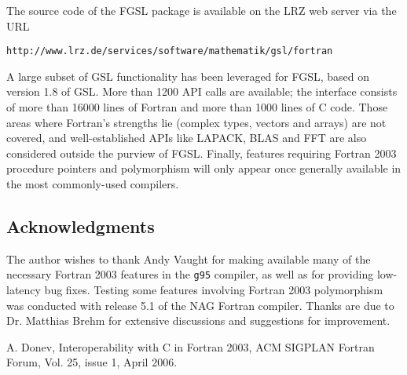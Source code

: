 \documentclass{article}
\begin{document}
The source code of the FGSL package is available on the LRZ web server
via the URL
\begin{center}
 \texttt{http://www.lrz.de/services/software/mathematik/gsl/fortran}
\end{center}
A large subset of GSL functionality has been leveraged for FGSL, based on 
version 1.8 of GSL. More than 1200 API calls are available; the interface
consists of more than 16000 lines of Fortran and more than 1000 lines of C code.
Those areas where Fortran's strengths lie (complex types, 
vectors and arrays) are not covered, and well-established APIs like
LAPACK, BLAS and FFT are also considered outside the purview of FGSL.
Finally, features
requiring Fortran 2003 procedure pointers and polymorphism will only appear once generally
available in the most commonly-used compilers.


{\small
\subsection{Acknowledgments}
\noindent
The author wishes to thank Andy Vaught for making available many of the 
necessary Fortran 2003 features in the \texttt{g95} compiler, as well as
for providing low-latency bug fixes. Testing some features involving 
Fortran 2003 polymorphism was conducted with release 5.1 of the
NAG Fortran compiler. Thanks are due to Dr. Matthias Brehm for extensive
discussions and suggestions for improvement.
}

{\small
\begin{thebibliography}{99}
   A. Donev, Interoperability with C in Fortran 2003,
  ACM SIGPLAN Fortran Forum, Vol. 25, issue 1, April 2006.
\end{thebibliography}
}
\end{document}
